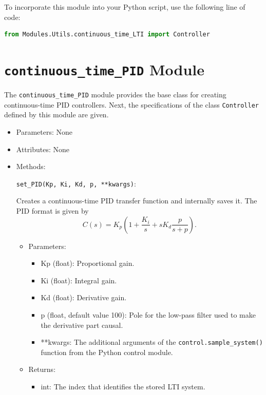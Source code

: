 \documentclass[12pt]{report}
\begin{document}
To incorporate this module into your Python script, use the following line of code:

\begin{lstlisting}[language = Python]
from Modules.Utils.continuous_time_LTI import Controller
\end{lstlisting}

\section{\texttt{continuous\_time\_PID} Module}

The \texttt{continuous\_time\_PID} module provides the base class for creating continuous-time PID controllers. Next, the specifications of the class \texttt{Controller} defined by this module are given.

\begin{itemize}

\item Parameters: None

\item Attributes: None

\item Methods:

\texttt{set\_PID(Kp, Ki, Kd, p, **kwargs)}:

Creates a continuous-time PID transfer function and internally saves it. The PID format is given by
$$ C(s) = K_p\left(1 + \frac{K_i}{s} + sK_d\frac{p}{s+p}\right).$$

\begin{itemize}
\item Parameters:

\begin{itemize}

\item Kp (float): Proportional gain.

\item Ki (float): Integral gain.

\item Kd (float): Derivative gain.

\item p (float, default value 100): Pole for the low-pass filter used to make the derivative part causal.

\item **kwargs: The additional arguments of the \texttt{control.sample\_system()} function from the Python control module.

\end{itemize}

\item Returns:

\begin{itemize}

\item int: The index that identifies the stored LTI system.

\end{itemize}

\end{itemize}

\end{itemize}
\end{document}
